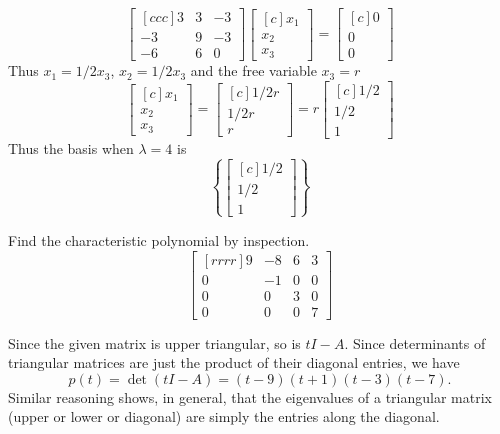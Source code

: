 \begin{solution}
$$\begin{bmatrix}[ccc]
3&3&-3\\
-3&9&-3\\
-6&6&0
\end{bmatrix}
\begin{bmatrix}[c]
x_1\\
x_2\\
x_3
\end{bmatrix}
=
\begin{bmatrix}[c]
0\\
0\\
0
\end{bmatrix}
$$
Thus $x_1 = 1/2x_3$, $x_2 = 1/2x_3$ and the free variable $x_3 = r$
$$
\begin{bmatrix}[c]
x_1\\
x_2\\
x_3
\end{bmatrix}
=
\begin{bmatrix}[c]
1/2r\\
1/2r\\
r
\end{bmatrix}
=
r
\begin{bmatrix}[c]
1/2\\
1/2\\
1
\end{bmatrix}
$$
Thus the basis when $\lambda = 4$ is
$$
\left\{
\begin{bmatrix}[c]
1/2\\
1/2\\
1
\end{bmatrix}
\right\}
$$
\end{solution}

\ii Find the characteristic polynomial by inspection.
$$
\begin{bmatrix}[rrrr]
9&-8&6&3\\
0&-1&0&0\\
0&0&3&0\\
0&0&0&7
\end{bmatrix}
$$
\begin{solution}
Since the given matrix is upper triangular, so is $tI - A$. Since determinants of triangular matrices are just the product of their diagonal entries, we have 
\[
p(t)=\det(tI-A)=(t-9)(t+1)(t-3)(t-7).
\]
Similar reasoning shows, in general, that the eigenvalues of a triangular matrix (upper or lower or diagonal) are simply the entries along the diagonal. 
\end{solution}


